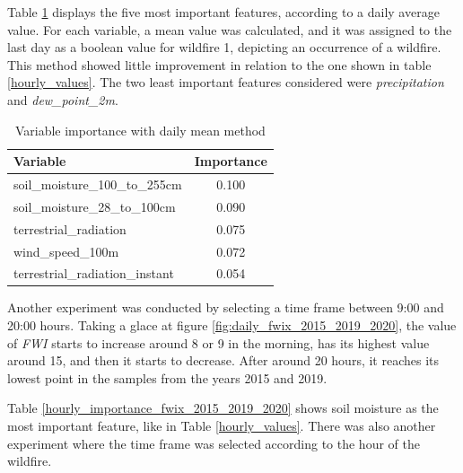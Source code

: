 Table \ref{daily_values} displays the five most important features, according to a daily average value. For each variable, a mean value was calculated, and it was assigned to the last day as a boolean value for wildfire 1, depicting an occurrence of a wildfire. This method showed little improvement in relation to the one shown in table \ref{hourly_values}. The two least important features considered were \textit{precipitation} and \textit{dew\_point\_2m}.
\begin{table}[H]
	\caption{Variable importance with daily mean method}
	\centering
	\label{daily_values}
	\begin{tabular}{lc}
		\hline
		Variable                        & \multicolumn{1}{l}{Importance} \\ \hline
		soil\_moisture\_100\_to\_255cm  & 0.100                          \\
		soil\_moisture\_28\_to\_100cm   & 0.090                          \\
		terrestrial\_radiation          & 0.075                          \\
		wind\_speed\_100m               & 0.072                          \\
		terrestrial\_radiation\_instant & 0.054                         
	\end{tabular}
\end{table}


Another experiment was conducted by selecting a time frame between 9:00 and 20:00 hours. Taking a glace at figure \ref{fig:daily_fwix_2015_2019_2020}, the value of \textit{FWI} starts to increase around 8 or 9 in the morning, has its highest value around 15, and then it starts to decrease. After around 20 hours, it reaches its lowest point in the samples from the years 2015 and 2019. 


Table \ref{hourly_importance_fwix_2015_2019_2020} shows soil moisture as the most important feature, like in Table \ref{hourly_values}. There was also another experiment where the time frame was selected according to the hour of the wildfire. 



